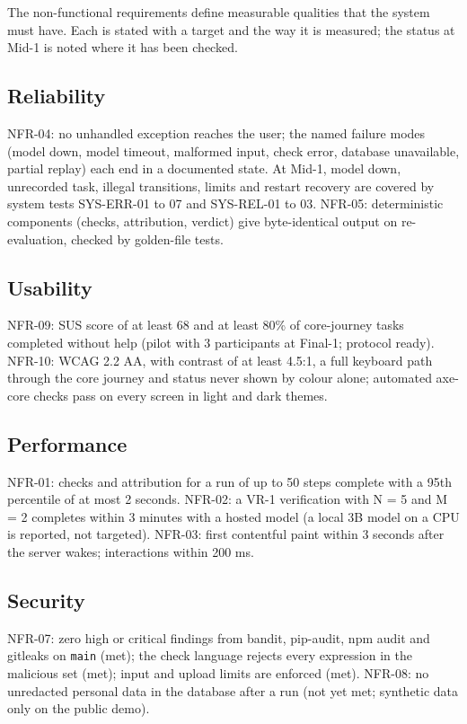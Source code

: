 The non-functional requirements define measurable qualities that the system must have. Each is stated with a target and the way it is measured; the status at Mid-1 is noted where it has been checked.

\subsection{Reliability}

NFR-04: no unhandled exception reaches the user; the named failure modes (model down, model timeout, malformed input, check error, database unavailable, partial replay) each end in a documented state. At Mid-1, model down, unrecorded task, illegal transitions, limits and restart recovery are covered by system tests SYS-ERR-01 to 07 and SYS-REL-01 to 03. NFR-05: deterministic components (checks, attribution, verdict) give byte-identical output on re-evaluation, checked by golden-file tests.

\subsection{Usability}

NFR-09: SUS score of at least 68 and at least 80\% of core-journey tasks completed without help (pilot with 3 participants at Final-1; protocol ready). NFR-10: WCAG 2.2 AA, with contrast of at least 4.5:1, a full keyboard path through the core journey and status never shown by colour alone; automated axe-core checks pass on every screen in light and dark themes.

\subsection{Performance}

NFR-01: checks and attribution for a run of up to 50 steps complete with a 95th percentile of at most 2 seconds. NFR-02: a VR-1 verification with N = 5 and M = 2 completes within 3 minutes with a hosted model (a local 3B model on a CPU is reported, not targeted). NFR-03: first contentful paint within 3 seconds after the server wakes; interactions within 200 ms.

\subsection{Security}

NFR-07: zero high or critical findings from bandit, pip-audit, npm audit and gitleaks on \texttt{main} (met); the check language rejects every expression in the malicious set (met); input and upload limits are enforced (met). NFR-08: no unredacted personal data in the database after a run (not yet met; synthetic data only on the public demo).


